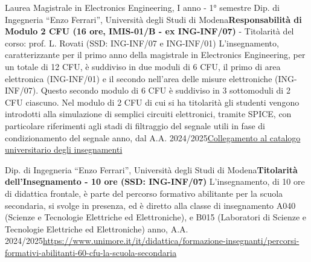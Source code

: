 {
{Laurea Magistrale in Electronics Engineering, I anno - 1° semestre}
{\newline  Dip. di Ingegneria “Enzo Ferrari'', Università degli Studi di Modena\newline \textbf{Responsabilità di Modulo 2 CFU (16 ore, IMIS-01/B - ex ING-INF/07)} - Titolarità del corso: prof. L. Rovati (SSD: ING-INF/07 e ING-INF/01)\newline
    L'insegnamento, caratterizzante per il primo anno della magistrale in Electronics Engineering, per un totale di 12 CFU, è suddiviso in due moduli di 6 CFU, il primo di area elettronica (ING-INF/01) e il secondo nell'area delle misure elettroniche (ING-INF/07). Questo secondo modulo di 6 CFU è suddiviso in 3 sottomoduli di 2 CFU ciascuno. Nel modulo di 2 CFU di cui si ha titolarità gli studenti vengono introdotti alla simulazione di semplici circuiti elettronici, tramite SPICE, con particolare riferimenti agli stadi di filtraggio del segnale utili in fase di condizionamento del segnale}{ anno, dal A.A. 2024/2025}{\href{https://unimore.coursecatalogue.cineca.it/insegnamenti/2024/28528/2024/10001/10858?coorte=2024&schemaid=21692}{Collegamento al catalogo universitario degli insegnamenti}}

{\newline  Dip. di Ingegneria “Enzo Ferrari'', Università degli Studi di Modena\newline \textbf{Titolarità dell'Insegnamento - 10 ore (SSD: ING-INF/07)}\newline
    L'insegnamento, di 10 ore di didattica frontale, è parte del percorso formativo abilitante per la scuola secondaria, si svolge in presenza, ed è diretto alla classe di insegnamento A040 (Scienze e Tecnologie Elettriche ed Elettroniche), e B015 (Laboratori di Scienze e Tecnologie Elettriche ed Elettroniche)}{ anno, A.A. 2024/2025}{\href{https://www.unimore.it/it/didattica/formazione-insegnanti/percorsi-formativi-abilitanti-60-cfu-la-scuola-secondaria}{https://www.unimore.it/it/didattica/formazione-insegnanti/percorsi-formativi-abilitanti-60-cfu-la-scuola-secondaria}}

}
